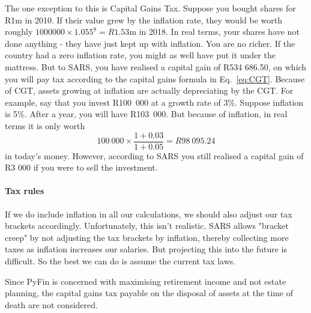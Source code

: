 \documentclass[a4paper, justified]{tufte-handout}
\begin{document}
The one exception to this is Capital Gains Tax. Suppose you bought shares for R1m in 2010. If their value grew by the inflation rate, they would be worth roughly $1000000\times1.055^8 = R1.53$m in 2018. In real terms, your shares have not done anything - they have just kept up with inflation. You are no richer. If the country had a zero inflation rate, you might as well have put it under the mattress. But to SARS, you have realised a capital gain of R534 686.50, on which you will pay tax according to the capital gains formula in Eq.~\ref{eq:CGT}. Because of CGT, assets growing at inflation are actually depreciating by the CGT. For example, say that you invest R100~000 at a growth rate of 3\%. Suppose inflation is 5\%. After a year, you will have R103~000. But because of inflation, in real terms it is only worth 
\begin{equation}
100~000 \times \frac{1+0.03}{1+0.05} = R98~095.24
\end{equation}
in today's money. However, according to SARS you still realised a capital gain of R3 000 if you were to sell the investment.

\paragraph{Tax rules} \label{tax rules}
If we do include inflation in all our calculations, we should also adjust our tax brackets accordingly. Unfortunately, this isn't realistic. SARS allows "bracket creep" by not adjusting the tax brackets by inflation, thereby collecting more taxes as inflation increases our salaries. But projecting this into the future is difficult. So the best we can do is assume the current tax laws.

Since PyFin is concerned with maximising retirement income and not estate planning, the capital gains tax payable on the disposal of assets at the time of death are not considered.
\end{document}
